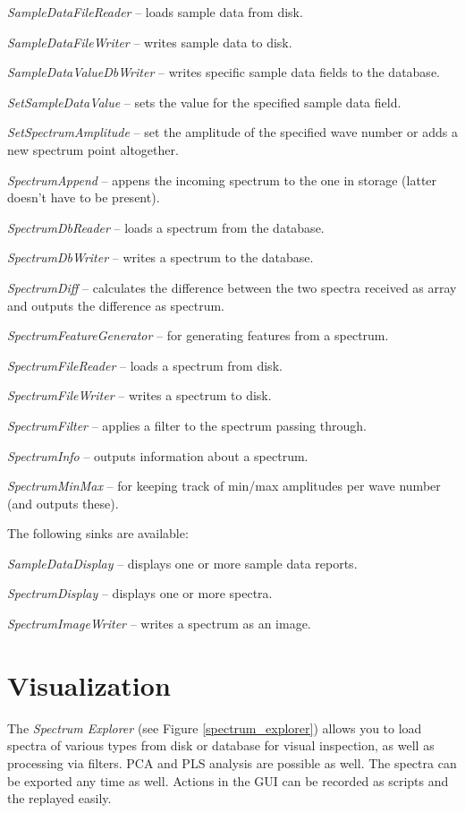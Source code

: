 \documentclass[a4paper]{book}
\begin{document}
\begin{tight_itemize}
  \item \textit{SampleDataFileReader} -- loads sample data from disk.
  \item \textit{SampleDataFileWriter} -- writes sample data to disk.
  \item \textit{SampleDataValueDbWriter} -- writes specific sample data fields
  to the database.
  \item \textit{SetSampleDataValue} -- sets the value for the specified
  sample data field.
  \item \textit{SetSpectrumAmplitude} -- set the amplitude of the
  specified wave number or adds a new spectrum point altogether.
  \item \textit{SpectrumAppend} -- appens the incoming spectrum to the one
  in storage (latter doesn't have to be present).
  \item \textit{SpectrumDbReader} -- loads a spectrum from the database.
  \item \textit{SpectrumDbWriter} -- writes a spectrum to the database.
  \item \textit{SpectrumDiff} -- calculates the difference between the
  two spectra received as array and outputs the difference as spectrum.
  \item \textit{SpectrumFeatureGenerator} -- for generating features from
  a spectrum.
  \item \textit{SpectrumFileReader} -- loads a spectrum from disk.
  \item \textit{SpectrumFileWriter} -- writes a spectrum to disk.
  \item \textit{SpectrumFilter} -- applies a filter to the spectrum passing through.
  \item \textit{SpectrumInfo} -- outputs information about a spectrum.
  \item \textit{SpectrumMinMax} -- for keeping track of min/max amplitudes per
  wave number (and outputs these).
\end{tight_itemize}
The following sinks are available:
\begin{tight_itemize}
  \item \textit{SampleDataDisplay} -- displays one or more sample data reports.
  \item \textit{SpectrumDisplay} -- displays one or more spectra.
  \item \textit{SpectrumImageWriter} -- writes a spectrum as an image.
\end{tight_itemize}

\chapter{Visualization}
The \textit{Spectrum Explorer} (see Figure \ref{spectrum_explorer}) allows you
to load spectra of various types from disk or database for visual inspection,
as well as processing via filters. PCA and PLS analysis are possible as well.
The spectra can be exported any time as well.
Actions in the GUI can be recorded as scripts and the replayed easily.
\end{document}
